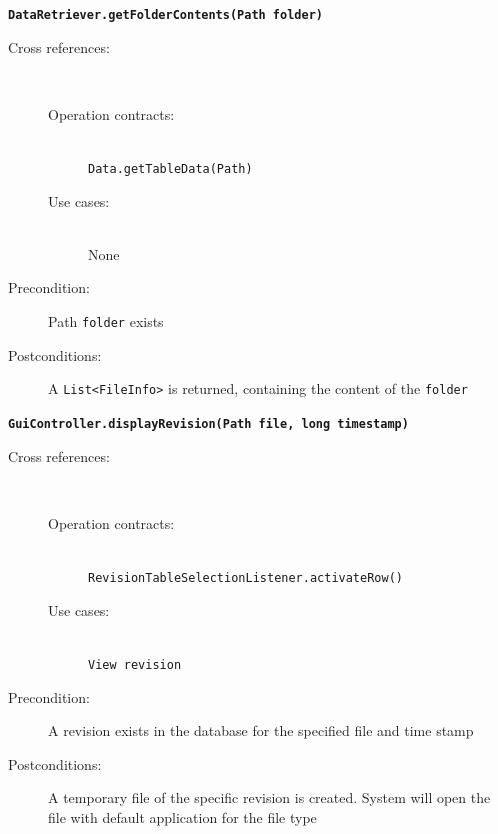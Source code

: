 \documentclass[12pt,a4paper]{article}
\begin{document}
\vspace{0.75cm}

\textbf{\texttt{DataRetriever.getFolderContents(Path folder)}}
\begin{description}
	\item[Cross references:] \hfill \vspace{-4ex}  \\
	\begin{description} 
		\item[Operation contracts:] \hfill \\
			\texttt{Data.getTableData(Path)}
		\item[Use cases:] \hfill \\
			None
	\end{description}
	\item[Precondition:] Path \texttt{folder} exists
	\item[Postconditions:] A \texttt{List<FileInfo>} is returned, containing the content of the \texttt{folder}
\end{description}

\vspace{0.75cm}

\textbf{\texttt{GuiController.displayRevision(Path file, long timestamp)}}
\begin{description}
	\item[Cross references:] \hfill \vspace{-4ex}  \\
	\begin{description} 
		\item[Operation contracts:] \hfill \\
			\texttt{RevisionTableSelectionListener.activateRow()}
		\item[Use cases:] \hfill \\
			\texttt{View revision}
	\end{description}	
	\item[Precondition:] A revision exists in the database for the specified file and time stamp
	\item[Postconditions:] A temporary file of the specific revision is created. System will open the file with default application for the file type
\end{description}

\vspace{0.75cm}
\end{document}
